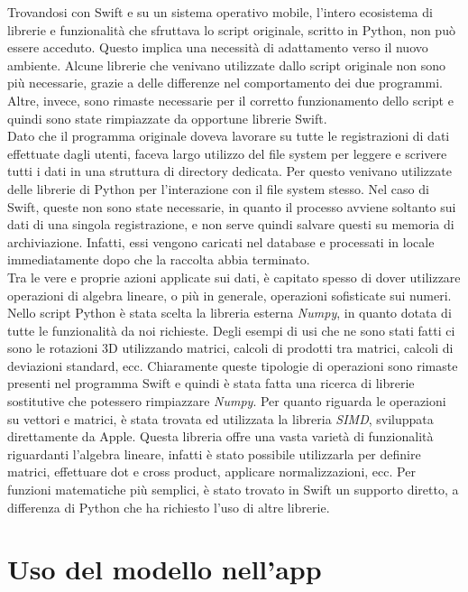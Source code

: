 Trovandosi con Swift e su un sistema operativo mobile, l'intero ecosistema di librerie
e funzionalità che sfruttava lo script originale, scritto in Python, non può essere
acceduto. Questo implica una necessità di adattamento verso il nuovo ambiente. 
Alcune librerie che venivano utilizzate dallo script originale non sono più
necessarie, grazie a delle differenze nel comportamento dei due programmi.
Altre, invece, sono rimaste necessarie per il corretto funzionamento dello script e 
quindi sono state rimpiazzate da opportune librerie Swift.\\
Dato che il programma originale doveva lavorare su tutte le registrazioni di dati 
effettuate dagli utenti, faceva largo utilizzo del file system per leggere e scrivere 
tutti i dati in una struttura di directory dedicata. Per questo venivano utilizzate
delle librerie di Python per l'interazione con il file system stesso. Nel caso di 
Swift, queste non sono state necessarie, in quanto il processo avviene soltanto 
sui dati di una singola registrazione, e non serve quindi salvare questi su memoria
di archiviazione. Infatti, essi vengono caricati nel database e processati in locale
immediatamente dopo che la raccolta abbia terminato.\\
Tra le vere e proprie azioni applicate sui dati, è capitato spesso di dover utilizzare 
operazioni di algebra lineare, o più in generale, operazioni sofisticate sui numeri.
Nello script Python è stata scelta la libreria esterna \emph{Numpy}, in quanto dotata
di tutte le funzionalità da noi richieste. Degli esempi di usi che ne sono stati fatti 
ci sono le rotazioni 3D utilizzando matrici, calcoli di prodotti tra matrici, calcoli 
di deviazioni standard, ecc. Chiaramente queste tipologie di operazioni sono rimaste
presenti nel programma Swift e quindi è stata fatta una ricerca di librerie sostitutive 
che potessero rimpiazzare \emph{Numpy}. Per quanto riguarda le operazioni su vettori 
e matrici, è stata trovata ed utilizzata la libreria \emph{SIMD}, sviluppata 
direttamente da Apple. Questa libreria offre una vasta varietà di funzionalità
riguardanti l'algebra lineare, infatti è stato possibile utilizzarla per definire
matrici, effettuare dot e cross product, applicare normalizzazioni, ecc.
Per funzioni matematiche più semplici, è stato trovato in Swift un supporto 
diretto, a differenza di Python che ha richiesto l'uso di altre librerie.

\section{Uso del modello nell'app}

